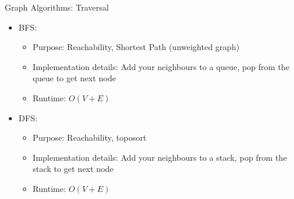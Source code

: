 \documentclass{beamer}
\begin{document}
\begin{frame}[t]{Graph Algorithms: Traversal}
  \begin{itemize}
      \item \alert{BFS:} 
      \begin{itemize}
          \item \alert{Purpose:} Reachability, Shortest Path (unweighted graph)
          \item \alert{Implementation details:} Add your neighbours to a \alert{queue}, pop from the queue to get next node
          \item \alert{Runtime:} $O(V + E)$
      \end{itemize}
    \pause
      \item \alert{DFS:} 
      \begin{itemize}
          \item \alert{Purpose:} Reachability, toposort 
          \item \alert{Implementation details:} Add your neighbours to a \alert{stack}, pop from the stack to get next node
          \item \alert{Runtime:} $O(V + E)$
      \end{itemize}
  \end{itemize}
\end{frame}
\end{document}
